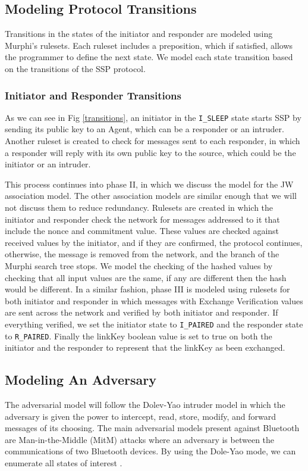 \documentclass{acm_proc_article-sp}
\begin{document}
\subsection{Modeling Protocol Transitions}
Transitions in the states of the initiator and responder are modeled using Murphi's rulesets. Each ruleset includes a preposition, which if satisfied, allows the programmer to define the next state. We model each state transition based on the transitions of the SSP protocol.

\subsubsection{Initiator and Responder Transitions}

As we can see in Fig \ref{transitions}, an initiator in the \texttt{I\_SLEEP} state starts SSP by sending its public key to an Agent, which can be a responder or an intruder. Another ruleset is created to check for messages sent to each responder, in which a responder will reply with its own public key to the source, which could be the initiator or an intruder.

This process continues into phase II, in which we discuss the model for the JW association model. The other association models are similar enough that we will not discuss them to reduce redundancy. Rulesets are created in which the initiator and responder check the network for messages addressed to it that include the nonce and commitment value. These values are checked against received values by the initiator, and if they are confirmed, the protocol continues, otherwise, the message is removed from the network, and the branch of the Murphi search tree stops. We model the checking of the hashed values by checking that all input values are the same, if any are different then the hash would be different. In a similar fashion, phase III is modeled using rulesets for both initiator and responder in which messages with Exchange Verification values are sent across the network and verified by both initiator and responder. If everything verified, we set the initiator state to \texttt{I\_PAIRED} and the responder state to \texttt{R\_PAIRED}. Finally the linkKey boolean value is set to true on both the initiator and the responder to represent that the linkKey as been exchanged.

\subsection{Modeling An Adversary}
The adversarial model will follow the Dolev-Yao intruder model \cite{dolev:yao} in which the adversary is given the power to intercept, read, store, modify, and forward messages of its choosing. The main adversarial models present against Bluetooth are Man-in-the-Middle (MitM) attacks where an adversary is between the communications of two Bluetooth devices. By using the Dole-Yao mode, we can enumerate all states of interest \cite{dolev:yao}.
\end{document}

